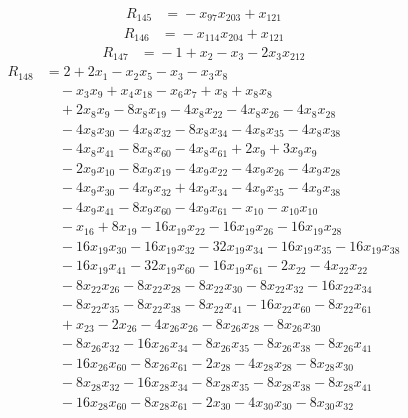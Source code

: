 \begin{align*}
R_{145}&={}-x_{97}x_{203} +x_{121}
\end{align*}
\begin{align*}
R_{146}&={}-x_{114}x_{204} +x_{121}
\end{align*}
\begin{align*}
R_{147}&={}-1 +x_{2} -x_{3} -2x_{3}x_{212}
\end{align*}
\begin{align*}
R_{148}&={}2 +2x_{1} -x_{2}x_{5} -x_{3} -x_{3}x_{8}\\
&\quad{}-x_{3}x_{9} +x_{4}x_{18} -x_{6}x_{7} +x_{8} +x_{8}x_{8}\\
&\quad{}+2x_{8}x_{9} -8x_{8}x_{19} -4x_{8}x_{22} -4x_{8}x_{26} -4x_{8}x_{28}\\
&\quad{}-4x_{8}x_{30} -4x_{8}x_{32} -8x_{8}x_{34} -4x_{8}x_{35} -4x_{8}x_{38}\\
&\quad{}-4x_{8}x_{41} -8x_{8}x_{60} -4x_{8}x_{61} +2x_{9} +3x_{9}x_{9}\\
&\quad{}-2x_{9}x_{10} -8x_{9}x_{19} -4x_{9}x_{22} -4x_{9}x_{26} -4x_{9}x_{28}\\
&\quad{}-4x_{9}x_{30} -4x_{9}x_{32} +4x_{9}x_{34} -4x_{9}x_{35} -4x_{9}x_{38}\\
&\quad{}-4x_{9}x_{41} -8x_{9}x_{60} -4x_{9}x_{61} -x_{10} -x_{10}x_{10}\\
&\quad{}-x_{16} +8x_{19} -16x_{19}x_{22} -16x_{19}x_{26} -16x_{19}x_{28}\\
&\quad{}-16x_{19}x_{30} -16x_{19}x_{32} -32x_{19}x_{34} -16x_{19}x_{35} -16x_{19}x_{38}\\
&\quad{}-16x_{19}x_{41} -32x_{19}x_{60} -16x_{19}x_{61} -2x_{22} -4x_{22}x_{22}\\
&\quad{}-8x_{22}x_{26} -8x_{22}x_{28} -8x_{22}x_{30} -8x_{22}x_{32} -16x_{22}x_{34}\\
&\quad{}-8x_{22}x_{35} -8x_{22}x_{38} -8x_{22}x_{41} -16x_{22}x_{60} -8x_{22}x_{61}\\
&\quad{}+x_{23} -2x_{26} -4x_{26}x_{26} -8x_{26}x_{28} -8x_{26}x_{30}\\
&\quad{}-8x_{26}x_{32} -16x_{26}x_{34} -8x_{26}x_{35} -8x_{26}x_{38} -8x_{26}x_{41}\\
&\quad{}-16x_{26}x_{60} -8x_{26}x_{61} -2x_{28} -4x_{28}x_{28} -8x_{28}x_{30}\\
&\quad{}-8x_{28}x_{32} -16x_{28}x_{34} -8x_{28}x_{35} -8x_{28}x_{38} -8x_{28}x_{41}\\
&\quad{}-16x_{28}x_{60} -8x_{28}x_{61} -2x_{30} -4x_{30}x_{30} -8x_{30}x_{32}\\

\end{align*}
